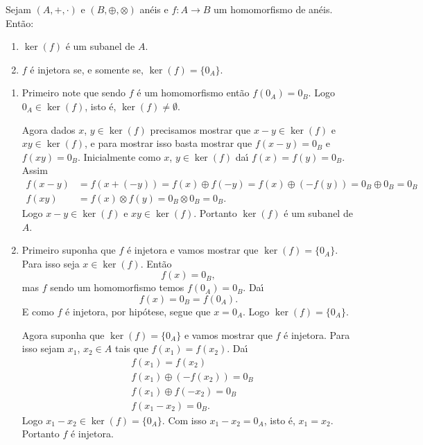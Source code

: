 \begin{proposicao}
	Sejam $(A, +, \cdot)$ e $(B, \oplus, \otimes)$ an\'eis e $f : A \to B$ um homomorfismo de an\'eis. Ent\~ao:
	\begin{enumerate}[label={\roman*})]
		\item $\ker(f)$ \'e um subanel de $A$.
		\item $f$ \'e injetora se, e somente se, $\ker(f) = \{0_A\}$.
	\end{enumerate}
\end{proposicao}
\begin{prova}
	\begin{enumerate}[label={\roman*})]
		\item Primeiro note que sendo $f$ \'e um homomorfismo ent\~ao $f(0_A) = 0_B$. Logo $0_A \in \ker(f)$, isto \'e, $\ker(f) \ne \emptyset$.

		Agora dados $x$, $y \in \ker(f)$ precisamos mostrar que $x - y \in \ker(f)$ e $xy \in \ker(f)$, e para mostrar isso basta mostrar que $f(x - y) = 0_B$ e$f(xy) = 0_B$. Inicialmente como $x$, $y \in \ker(f)$ da{\'\i} $f(x) = f(y) = 0_B$. Assim
		\begin{align*}
			f(x - y) &= f(x + (-y)) = f(x) \oplus f(-y) = f(x) \oplus (-f(y)) = 0_B \oplus 0_B = 0_B\\
			f(xy) &= f(x)\otimes f(y) = 0_B \otimes 0_B = 0_B.
		\end{align*}
		Logo $x - y \in \ker(f)$ e $xy \in \ker(f)$. Portanto $\ker(f)$ \'e um subanel de $A$.

		\item Primeiro suponha que $f$ \'e injetora e vamos mostrar que $\ker(f) = \{0_A\}$. Para isso seja $x \in \ker(f)$. Ent\~ao
		\[
			f(x) = 0_B,
		\]
		mas $f$ sendo um homomorfismo temos $f(0_A) = 0_B$. Da{\'\i}
		\[
			f(x) = 0_B = f(0_A).
		\]
		E como $f$ \'e injetora, por hip\'otese, segue que $x = 0_A$. Logo $\ker(f) = \{0_A\}$.

		Agora suponha que $\ker(f) = \{0_A\}$ e vamos mostrar que $f$ \'e injetora. Para isso sejam $x_1$, $x_2 \in A$ tais que $f(x_1) = f(x_2)$. Da{\'\i}
		\begin{align*}
			&f(x_1) = f(x_2)\\
			&f(x_1) \oplus (-f(x_2)) = 0_B\\
			&f(x_1) \oplus f(-x_2) = 0_B\\
			&f(x_1 - x_2) = 0_B.
		\end{align*}
		Logo $x_1 - x_2 \in \ker(f) = \{0_A\}$. Com isso $x_1 - x_2 = 0_A$, isto \'e, $x_1 = x_2$. Portanto $f$ \'e injetora.
	\end{enumerate}
\end{prova}

